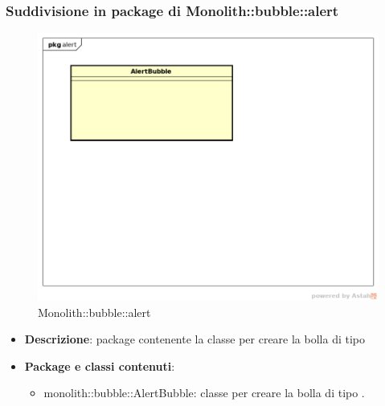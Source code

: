 	\subsubsection{Suddivisione in package  di Monolith::bubble::alert}
\label{Monolith::bubble::alert}
\begin{figure}[H]
	\centering
	\includegraphics[scale=0.5]{Sezioni/imgPackage/bubble_alert.png}
	\caption{Monolith::bubble::alert}
\end{figure}
\begin{itemize}
	\item{\textbf{Descrizione}}: package contenente la classe per creare la bolla di tipo 
	\item{\textbf{Package e classi contenuti}}:
	\begin{itemize}
	\item{monolith::bubble::AlertBubble}: classe per creare la bolla di tipo .
	\end{itemize}
\end{itemize}



